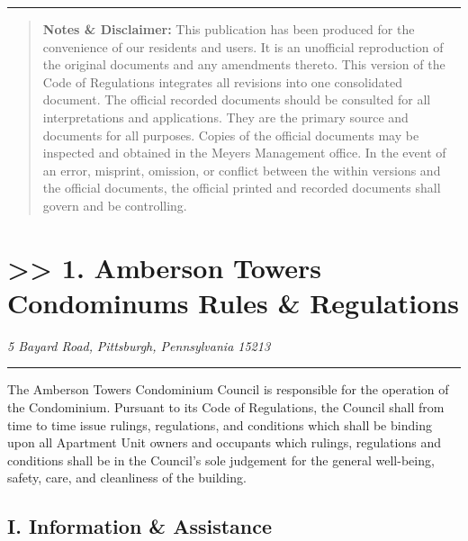 \documentclass[
  14pt,
]{book}
\begin{document}
\begin{center}\rule{0.5\linewidth}{0.5pt}\end{center}

\begin{quote}
\textbf{Notes \& Disclaimer:} This publication has been produced for the convenience of our residents and users. It is an unofficial reproduction of the original documents and any amendments thereto. This version of the Code of Regulations integrates all revisions into one consolidated document. The official recorded documents should be consulted for all interpretations and applications. They are the primary source and documents for all purposes. Copies of the official documents may be inspected and obtained in the Meyers Management office. In the event of an error, misprint, omission, or conflict between the within versions and the official documents, the official printed and recorded documents shall govern and be controlling.
\end{quote}

\hypertarget{amberson-towers-condominums-rules-regulations}{%
\chapter*{\texorpdfstring{\textgreater\textgreater{} 1. Amberson Towers Condominums Rules \& Regulations}{\textgreater\textgreater{} 1. Amberson Towers Condominums   Rules \& Regulations}}\label{amberson-towers-condominums-rules-regulations}}

\emph{5 Bayard Road, }
\emph{Pittsburgh, Pennsylvania 15213}

\begin{center}\rule{0.5\linewidth}{0.5pt}\end{center}

The Amberson Towers Condominium Council is responsible for the operation of the Condominium. Pursuant to its Code of Regulations, the Council shall from time to time issue rulings, regulations, and conditions which shall be binding upon all Apartment Unit owners and occupants which rulings, regulations and conditions shall be in the Council's sole judgement for the general well-being, safety, care, and cleanliness of the building.

\hypertarget{i.-information-assistance}{%
\section*{I. Information \& Assistance}\label{i.-information-assistance}}
\end{document}
